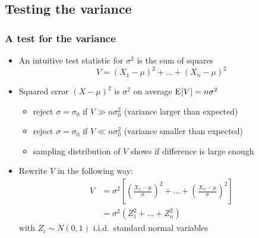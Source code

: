 \documentclass[t,notes=show]{beamer} %
\begin{document}
\subsection{Testing the variance}

\begin{frame}
  \frametitle{A test for the variance}

  \begin{itemize}
  \item An intuitive test statistic for $\sigma^2$ is the sum of squares
    \[
    V = (X_1 - \mu)^2 + \dots + (X_n - \mu)^2
    \]
  \item Squared error $(X - \mu)^2$ is $\sigma^2$ on average \so
    $\mathrm{E}_{}[V] = n \sigma^2$
    \begin{itemize}
    \item reject $\sigma = \sigma_0$ if $V\gg n \sigma^2_0$ (variance larger than expected)
    \item reject $\sigma = \sigma_0$ if $V\ll n \sigma^2_0$ (variance smaller than expected)
    \item[\hand] sampling distribution of $V$ shows if difference is large
      enough
    \end{itemize}
    \pause
  \item Rewrite $V$ in the following way:
    \begin{align*}
      V &= \sigma^2 \left[
        \left( \frac{X_1 - \mu}{\sigma} \right)^2 + \dots 
        + \left( \frac{X_n - \mu}{\sigma} \right)^2
      \right] \\
      &= \sigma^2 (Z_1^2 + \dots + Z_n^2)
    \end{align*}
    with $Z_i\sim N(0,1)$ i.i.d.\ standard normal variables
  \end{itemize}
\end{frame}
\end{document}
